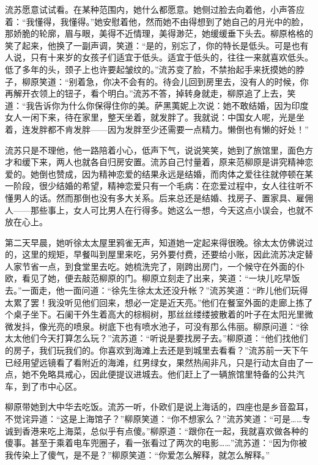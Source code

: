 \par 流苏愿意试试看。在某种范围内，她什么都愿意。她侧过脸去向着他，小声答应着：“我懂得，我懂得。”她安慰着他，然而她不由得想到了她自己的月光中的脸，那娇脆的轮廓，眉与眼，美得不近情理，美得渺茫，她缓缓垂下头去。柳原格格的笑了起来，他换了一副声调，笑道：“是的，别忘了，你的特长是低头。可是也有人说，只有十来岁的女孩子们适宜于低头。适宜于低头的，往往一来就喜欢低头。低了多年的头，颈子上也许要起皱纹的。”流苏变了脸，不禁抬起手来抚摸她的脖子，柳原笑道：“别着急，你决不会有的。待会儿回到房里去，没有人的时候，你再解开衣领上的钮子，看个明白。”流苏不答，掉转身就走，柳原追了上去，笑道：“我告诉你为什么你保得住你的美。萨黑荑妮上次说：她不敢结婚，因为印度女人一闲下来，待在家里，整天坐着，就发胖了。我就说：中国女人呢，光是坐着，连发胖都不肯发胖——因为发胖至少还需要一点精力。懒倒也有懒的好处！”
\par 流苏只是不理他，他一路陪着小心，低声下气，说说笑笑，她到了旅馆里，面色方才和缓下来，两人也就各自归房安置。流苏自己忖量着，原来范柳原是讲究精神恋爱的。她倒也赞成，因为精神恋爱的结果永远是结婚，而肉体之爱往往就停顿在某一阶段，很少结婚的希望，精神恋爱只有一个毛病：在恋爱过程中，女人往往听不懂男人的话。然而那倒也没有多大关系。后来总还是结婚、找房子、置家具、雇佣人——那些事上，女人可比男人在行得多。她这么一想，今天这点小误会，也就不放在心上。
\par 第二天早晨，她听徐太太屋里鸦雀无声，知道她一定起来得很晚。徐太太仿佛说过的，这里的规矩，早餐叫到屋里来吃，另外要付费，还要给小账，因此流苏决定替人家节省一点，到食堂里去吃。她梳洗完了，刚跨出房门，一个候守在外面的仆欧，看见了她，便去敲范柳原的门。柳原立刻走了出来，笑道：“一块儿吃早饭去。”一面走，他一面问道：“徐先生徐太太还没升帐？”流苏笑道：“昨儿他们玩得太累了罢！我没听见他们回来，想必一定是近天亮。”他们在餐室外面的走廊上拣了个桌子坐下。石阑干外生着高大的棕榈树，那丝丝缕缕披散着的叶子在太阳光里微微发抖，像光亮的喷泉。树底下也有喷水池子，可没有那么伟丽。柳原问道：“徐太太他们今天打算怎么玩？”流苏道：“听说是要找房子去。”柳原道：“他们找他们的房子，我们玩我们的。你喜欢到海滩上去还是到城里去看看？”流苏前一天下午已经用望远镜看了看附近的海滩，红男绿女，果然热闹非凡，只是行动太自由了一点，她不免略具戒心，因此便提议进城去。他们赶上了一辆旅馆里特备的公共汽车，到了市中心区。
\par 柳原带她到大中华去吃饭。流苏一听，仆欧们是说上海话的，四座也是乡音盈耳，不觉诧异道：“这是上海馆子？”柳原笑道：“你不想家么？”流苏笑道：“可是……专诚到香港来吃上海菜，总似乎有点傻。”柳原道：“跟你在一起，我就喜欢做各种的傻事。甚至于乘着电车兜圈子，看一张看过了两次的电影……”流苏道：“因为你被我传染上了傻气，是不是？”柳原笑道：“你爱怎么解释，就怎么解释。”
